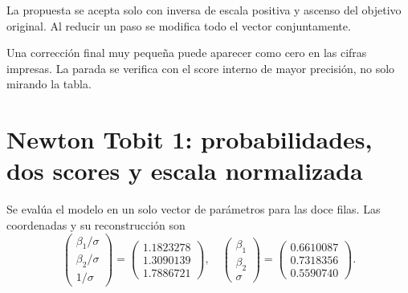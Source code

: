 \documentclass[11pt,a4paper]{article}
\begin{document}
La propuesta se acepta solo con
inversa de escala positiva
y ascenso del objetivo original.
Al reducir un paso se modifica
todo el vector conjuntamente.

Una corrección final muy pequeña
puede aparecer como cero
en las cifras impresas.
La parada se verifica con
el score interno de mayor precisión,
no solo mirando la tabla.

\clearpage
\section{Newton Tobit 1: probabilidades, dos scores y escala normalizada}\label{unidad107}
Se evalúa el modelo en un solo vector
de parámetros para las doce filas.
Las coordenadas y su reconstrucción son
\[
\begin{pmatrix}\beta_1/\sigma\\\beta_2/\sigma\\1/\sigma\end{pmatrix}=\begin{pmatrix}1.1823278\\1.3090139\\1.7886721\end{pmatrix},\quad\begin{pmatrix}\beta_1\\\beta_2\\\sigma\end{pmatrix}=\begin{pmatrix}0.6610087\\0.7318356\\0.5590740\end{pmatrix}.
\]
\end{document}
